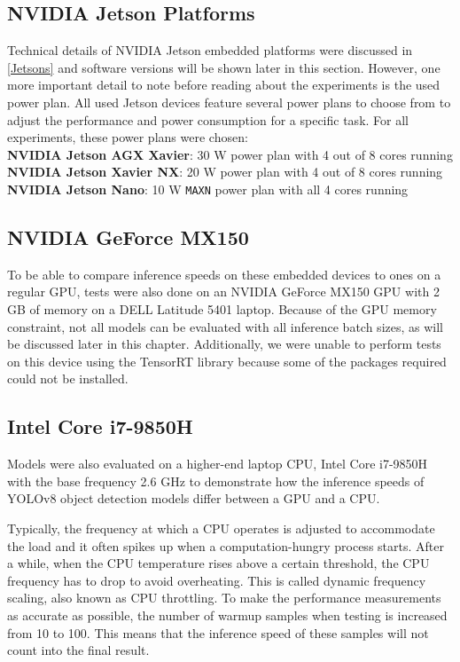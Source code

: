 \subsection{NVIDIA Jetson Platforms}

Technical details of NVIDIA Jetson embedded platforms were discussed in
\autoref{Jetsons} and software versions will be shown later in this section.
However, one more important detail to note before reading about the experiments
is the used power plan. All used Jetson devices feature several power plans to
choose from to adjust the performance and power consumption for a specific task.
For all experiments, these power plans were chosen: \\
\textbf{NVIDIA Jetson AGX Xavier}: 30 W power plan with 4 out of 8 cores running \\
\textbf{NVIDIA Jetson Xavier NX}: 20 W power plan with 4 out of 8 cores running \\
\textbf{NVIDIA Jetson Nano}: 10 W \texttt{MAXN} power plan with all 4 cores running


\subsection{NVIDIA GeForce MX150}

To be able to compare inference speeds on these embedded devices to ones on a
regular GPU, tests were also done on an NVIDIA GeForce MX150 GPU with 2 GB of
memory on a DELL Latitude 5401 laptop. Because of the GPU memory constraint, not
all models can be evaluated with all inference batch sizes, as will be discussed
later in this chapter. Additionally, we were unable to perform tests on this
device using the TensorRT library because some of the packages required could
not be installed.


\subsection{Intel Core i7-9850H}

Models were also evaluated on a higher-end laptop CPU, Intel Core i7-9850H with
the base frequency 2.6 GHz to demonstrate how the inference speeds of YOLOv8
object detection models differ between a GPU and a CPU.

Typically, the frequency at which a CPU operates is adjusted to accommodate the
load and it often spikes up when a computation-hungry process starts. After a
while, when the CPU temperature rises above a certain threshold, the CPU
frequency has to drop to avoid overheating. This is called dynamic frequency
scaling, also known as CPU throttling. To make the performance measurements as
accurate as possible, the number of warmup samples when testing is increased
from 10 to 100. This means that the inference speed of these samples will not
count into the final result.

